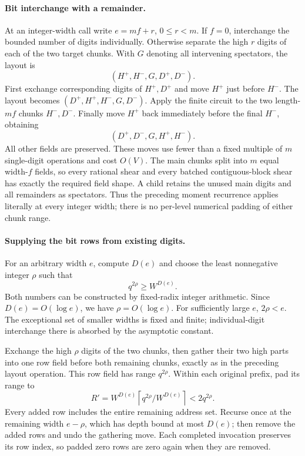 \paragraph{Bit interchange with a remainder.}
At an integer-width call write $e=mf+r$, $0\le r<m$.  If $f=0$, interchange
the bounded number of digits individually.  Otherwise separate the high
$r$ digits of each of the two target chunks.  With $G$ denoting all
intervening spectators, the layout is
\[
 (H^+,H^-,G,D^+,D^-).
\]
First exchange corresponding digits of $H^+,D^+$ and move $H^+$ just
before $H^-$.  The layout becomes
$(D^+,H^+,H^-,G,D^-)$.  Apply the finite circuit to the two length-$mf$
chunks $H^-,D^-$.  Finally move $H^+$ back immediately before the final
$H^-$, obtaining
\[
 (D^+,D^-,G,H^+,H^-).
\]
All other fields are preserved.  These moves use fewer than a fixed
multiple of $m$ single-digit operations and cost $O(V)$.  The main chunks
split into $m$ equal width-$f$ fields, so every rational shear and every
batched contiguous-block shear has exactly the required field shape.
A child retains the unused main digits and all remainders as spectators.
Thus the preceding moment recurrence applies literally at every integer
width; there is no per-level numerical padding of either chunk range.

\paragraph{Supplying the bit rows from existing digits.}
For an arbitrary width $e$, compute $D(e)$ and choose the least nonnegative
integer $\rho$ such that
\[
 q^{2\rho}\ge W^{D(e)}.
\]
Both numbers can be constructed by fixed-radix integer arithmetic.  Since
$D(e)=O(\log e)$, we have $\rho=O(\log e)$.  For sufficiently large $e$,
$2\rho<e$.  The exceptional set of smaller widths is fixed and finite;
individual-digit interchange there is absorbed by the asymptotic constant.

Exchange the high $\rho$ digits of the two chunks, then gather their two
high parts into one row field before both remaining chunks, exactly as in
the preceding layout operation.  This row field has range $q^{2\rho}$.
Within each original prefix, pad its range to
\[
 R'=W^{D(e)}\left\lceil q^{2\rho}/W^{D(e)}\right\rceil
       <2q^{2\rho}.
\]
Every added row includes the entire remaining address set.  Recurse once
at the remaining width $e-\rho$, which has depth bound at most $D(e)$;
then remove the added rows and undo the gathering move.  Each completed
invocation preserves its row index, so padded zero rows are zero again
when they are removed.

